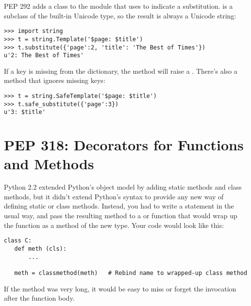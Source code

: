 \documentclass{howto}
\begin{document}
PEP 292 adds a  class to the  module
that uses \samp{\$} to indicate a substitution.   is a
subclass of the built-in Unicode type, so the result is always a
Unicode string:

\begin{verbatim}
>>> import string
>>> t = string.Template('$page: $title')
>>> t.substitute({'page':2, 'title': 'The Best of Times'})
u'2: The Best of Times'
\end{verbatim}


If a key is missing from the dictionary, the  method
will raise a .  There's also a 
method that ignores missing keys:

\begin{verbatim}
>>> t = string.SafeTemplate('$page: $title')
>>> t.safe_substitute({'page':3})
u'3: $title'
\end{verbatim}



\begin{seealso}
\end{seealso}


\section{PEP 318: Decorators for Functions and Methods}

Python 2.2 extended Python's object model by adding static methods and
class methods, but it didn't extend Python's syntax to provide any new
way of defining static or class methods.  Instead, you had to write a
 statement in the usual way, and pass the resulting
method to a  or 
function that would wrap up the function as a method of the new type.
Your code would look like this:

\begin{verbatim}
class C:
   def meth (cls):
       ...
   
   meth = classmethod(meth)   # Rebind name to wrapped-up class method
\end{verbatim}

If the method was very long, it would be easy to miss or forget the
 invocation after the function body.  
\end{document}
